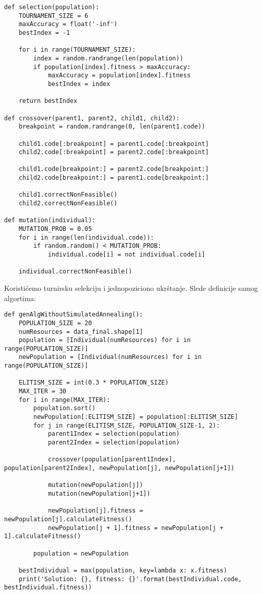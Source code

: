 \documentclass[11pt]{article} %
\begin{document}
\begin{lstlisting}
def selection(population):
    TOURNAMENT_SIZE = 6
    maxAccuracy = float('-inf')
    bestIndex = -1
    
    for i in range(TOURNAMENT_SIZE):
        index = random.randrange(len(population))
        if population[index].fitness > maxAccuracy:
            maxAccuracy = population[index].fitness
            bestIndex = index
    
    return bestIndex
    
def crossover(parent1, parent2, child1, child2):
    breakpoint = random.randrange(0, len(parent1.code))
    
    child1.code[:breakpoint] = parent1.code[:breakpoint]
    child2.code[:breakpoint] = parent2.code[:breakpoint]
    
    child1.code[breakpoint:] = parent2.code[breakpoint:]
    child2.code[breakpoint:] = parent1.code[breakpoint:]
    
    child1.correctNonFeasible()
    child2.correctNonFeasible()
    
def mutation(individual):
    MUTATION_PROB = 0.05
    for i in range(len(individual.code)):
        if random.random() < MUTATION_PROB:
            individual.code[i] = not individual.code[i]
            
    individual.correctNonFeasible()
\end{lstlisting}

Koristićemo turnirsku selekciju i jednopoziciono ukrštanje. Slede definicije samog algortima:

\begin{lstlisting}
def genAlgWithoutSimulatedAnnealing():
    POPULATION_SIZE = 20
    numResources = data_final.shape[1]
    population = [Individual(numResources) for i in range(POPULATION_SIZE)]
    newPopulation = [Individual(numResources) for i in range(POPULATION_SIZE)]

    ELITISM_SIZE = int(0.3 * POPULATION_SIZE)
    MAX_ITER = 30
    for i in range(MAX_ITER):
        population.sort()
        newPopulation[:ELITISM_SIZE] = population[:ELITISM_SIZE]
        for j in range(ELITISM_SIZE, POPULATION_SIZE-1, 2):
            parent1Index = selection(population)
            parent2Index = selection(population)
            
            crossover(population[parent1Index], population[parent2Index], newPopulation[j], newPopulation[j+1])

            mutation(newPopulation[j])
            mutation(newPopulation[j+1])

            newPopulation[j].fitness = newPopulation[j].calculateFitness()
            newPopulation[j + 1].fitness = newPopulation[j + 1].calculateFitness()

        population = newPopulation

    bestIndividual = max(population, key=lambda x: x.fitness)
    print('Solution: {}, fitness: {}'.format(bestIndividual.code, bestIndividual.fitness))
    
\end{lstlisting}
\end{document}

